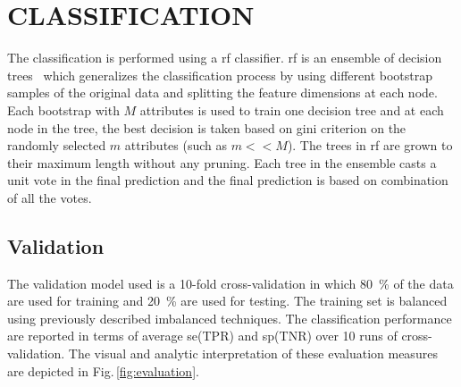 \section{\uppercase{Classification}}
\noindent The classification is performed using a \ac{rf} classifier. 
\Ac{rf} is an ensemble of decision trees~\cite{breiman2001random} which generalizes the classification process by using different bootstrap samples of the original data and splitting the feature dimensions at each node.
Each bootstrap with $M$ attributes is used to train one decision tree and at each node in the tree, the best decision is taken based on gini criterion on the randomly selected $m$ attributes (such as $m<<M$). 
The trees in \ac{rf} are grown to their maximum length without any pruning.
Each tree in the ensemble casts a unit vote in the final prediction and the final prediction is based on combination of all the votes. 


\subsection{Validation}
The validation model used is a 10-fold cross-validation in which \SI{80}{\percent} of the data are used for training and \SI{20}{\percent} are used for testing. 
The training set is balanced using previously described imbalanced techniques. 
The classification performance are reported in terms of average \ac{se}(TPR) and \ac{sp}(TNR) over 10 runs of cross-validation. 
The visual and analytic interpretation of these evaluation measures are depicted in Fig.\,\ref{fig:evaluation}.
 


